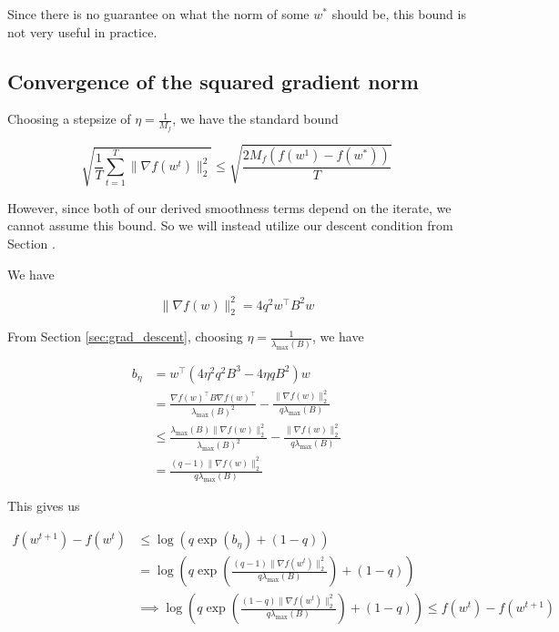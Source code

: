 \documentclass[11pt]{article}
\begin{document}
Since there is no guarantee on what the norm of some $w^*$ should be, this bound is not very useful in practice.

\subsection{Convergence of the squared gradient norm}


Choosing a stepsize of $\eta = \frac{1}{M_f}$, we have the standard bound

\begin{equation}
    \sqrt{\frac{1}{T} \sum_{t=1}^{T} \| \nabla f(w^t) \|_2^2} \leq \sqrt{\frac{2 M_f (f(w^1) - f(w^*))}{T}}
\end{equation}

However, since both of our derived smoothness terms depend on the iterate, we cannot assume this bound. So we will instead utilize our descent condition from Section \label{sec:grad_descent}.

We have

\begin{equation}
    \| \nabla f(w) \|_2^2 = 4 q^2 w^{\top} B^2 w
\end{equation}

From Section \ref{sec:grad_descent}, choosing $\eta = \frac{1}{\lambda_{\max}(B)}$, we have

\begin{align*}
    b_\eta &= w^{\top} ( 4 \eta^2 q^2 B^3 - 4 \eta q B^2)w \\
    &= \frac{\nabla f(w)^{\top} B \nabla f(w)^{\top}}{\lambda_{\max}(B)^2} - \frac{\| \nabla f(w) \|_2^2}{q \lambda_{\max}(B)} \\
    &\leq \frac{ \lambda_{\max}(B) \| \nabla f(w) \|_2^2}{\lambda_{\max}(B)^2} - \frac{\| \nabla f(w) \|_2^2}{q \lambda_{\max}(B)}\\
    &= \frac{(q-1) \| \nabla f(w) \|_2^2}{q \lambda_{\max}(B)}
\end{align*}

This gives us

\begin{align*}
    f(w^{t+1}) - f(w^t) &\leq \log( q \exp(b_\eta ) + (1 - q)) \\
    &= \log \left( q \exp \left( \frac{(q-1) \| \nabla f(w^t) \|_2^2}{q \lambda_{\max}(B)} \right) + (1 - q) \right) \\
    &\implies \log \left( q \exp \left( \frac{(1-q) \| \nabla f(w^t) \|_2^2}{q \lambda_{\max}(B)} \right) + (1-q) \right) \leq f(w^t) - f(w^{t+1}) 
\end{align*}
\end{document}
